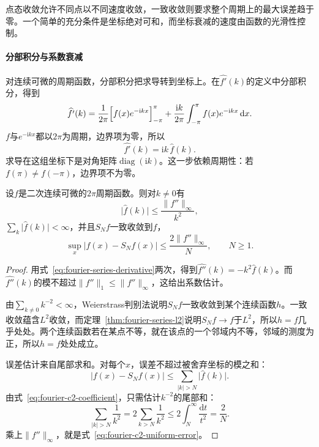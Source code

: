 点态收敛允许不同点以不同速度收敛，一致收敛则要求整个周期上的最大误差趋于零。一个简单的充分条件是坐标绝对可和，而坐标衰减的速度由函数的光滑性控制。

\paragraph{分部积分与系数衰减}

对连续可微的周期函数，分部积分把求导转到坐标上。在$\widehat{f'}(k)$的定义中分部积分，得到
\[
\widehat{f'}(k)=\frac1{2\pi}\Bigl[f(x)e^{-\mathrm ikx}\Bigr]_{-\pi}^{\pi}+\frac{\mathrm ik}{2\pi}\int_{-\pi}^{\pi}f(x)e^{-\mathrm ikx}\,\mathrm dx.
\]
$f$与$e^{-\mathrm ikx}$都以$2\pi$为周期，边界项为零，所以
\begin{equation}
\widehat{f'}(k)=\mathrm ik\,\widehat f(k).
\label{eq:fourier-series-derivative}
\end{equation}
求导在这组坐标下是对角矩阵$\operatorname{diag}(\mathrm ik)$。这一步依赖周期性：若$f(\pi)\neq f(-\pi)$，边界项不为零。

\begin{theorem}[$C^2$函数的一致收敛]
\label{thm:fourier-uniform}
设$f$是二次连续可微的$2\pi$周期函数。则对$k\neq0$有
\begin{equation}
\lvert\widehat f(k)\rvert\leq\frac{\lVert f''\rVert_\infty}{k^2},
\label{eq:fourier-c2-coefficient}
\end{equation}
$\sum_k\lvert\widehat f(k)\rvert<\infty$，并且$S_Nf$一致收敛到$f$，
\begin{equation}
\sup_x\lvert f(x)-S_Nf(x)\rvert\leq\frac{2\lVert f''\rVert_\infty}{N},\qquad N\geq1 .
\label{eq:fourier-c2-uniform-error}
\end{equation}
\end{theorem}

\begin{proof}
用式~\eqref{eq:fourier-series-derivative}两次，得到$\widehat{f''}(k)=-k^2\widehat f(k)$。而$\widehat{f''}(k)$的模不超过$\lVert f''\rVert_1\leq\lVert f''\rVert_\infty$，这给出系数估计。

由$\sum_{k\neq0}k^{-2}<\infty$，Weierstrass判别法说明$S_Nf$一致收敛到某个连续函数$h$。一致收敛蕴含$L^2$收敛，而定理~\ref{thm:fourier-series-l2}说明$S_Nf\to f$于$L^2$，所以$h=f$几乎处处。两个连续函数若在某点不等，就在该点的一个邻域内不等，邻域的测度为正，所以$h=f$处处成立。

误差估计来自尾部求和。对每个$x$，误差不超过被舍弃坐标的模之和：
\[
\lvert f(x)-S_Nf(x)\rvert\leq\sum_{\lvert k\rvert>N}\lvert\widehat f(k)\rvert.
\]
由式~\eqref{eq:fourier-c2-coefficient}，只需估计$k^{-2}$的尾部和：
\[
\sum_{\lvert k\rvert>N}\frac1{k^2}=2\sum_{k>N}\frac1{k^2}\leq2\int_N^\infty\frac{\mathrm dt}{t^2}=\frac2N.
\]
乘上$\lVert f''\rVert_\infty$，就是式~\eqref{eq:fourier-c2-uniform-error}。
\end{proof}

